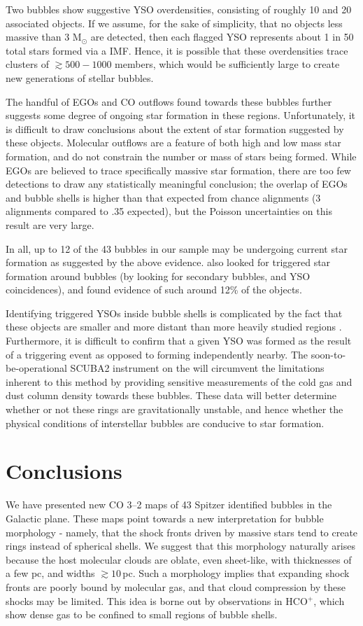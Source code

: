 Two bubbles show suggestive YSO overdensities, consisting of roughly 10 and 20 associated objects.
If we assume, for the sake of simplicity, that no objects less massive than 3 M$_\odot$ are detected, then each
flagged YSO represents about 1 in 50 total stars formed via a  IMF.
Hence, it is possible that these overdensities trace clusters of $\gtrsim 500-1000$ members,
which would be sufficiently large to create new generations of stellar bubbles.

The handful of EGOs and CO outflows found towards these bubbles further suggests some degree
of ongoing star formation in these regions. Unfortunately, it is difficult to draw conclusions
about the extent of star formation suggested by these objects. Molecular outflows are a feature of both
high and low mass star formation, and do not constrain the number or mass of stars being formed.
While EGOs are believed to trace specifically massive star formation, there are too
few detections to draw any statistically meaningful conclusion; the overlap of EGOs and
bubble shells is higher than that expected from chance alignments (3 alignments compared to .35 expected),
but the Poisson uncertainties on this result are very large.

In all, up to 12 of the 43 bubbles in our sample may be undergoing current star formation
as suggested by the above evidence.  also looked for triggered star formation
around bubbles (by looking for secondary bubbles, and YSO coincidences),
and found evidence of such around 12\% of the objects.

Identifying triggered YSOs inside bubble shells is complicated by the fact
that these objects are smaller and more distant than more heavily studied regions
\citep{Koenig08, Povich09}. Furthermore, it is difficult to confirm that a given
YSO was formed as the result of a triggering event as opposed to forming independently nearby.
The soon-to-be-operational SCUBA2
instrument on the \jcmt will circumvent the limitations inherent to this method by providing sensitive
measurements of the cold gas and dust column density towards these bubbles. These data will better determine
whether or not these rings are gravitationally unstable, and hence whether the physical
conditions of interstellar bubbles are conducive to star formation.

\section{Conclusions}
\label{sec:conclusion}
We have presented new CO 3--2 maps of 43 Spitzer identified
bubbles in the Galactic plane.  These maps point towards a new
interpretation for bubble morphology - namely, that the shock fronts
driven by massive stars tend to create rings instead of
spherical shells. We suggest that this morphology naturally arises
because the host molecular clouds are oblate, even sheet-like, with thicknesses of a few pc, and
widths $\gtrsim10$\,pc.
Such a morphology implies that expanding shock fronts are poorly bound by
molecular gas, and that cloud compression by these shocks may be limited. This
idea is borne out by observations in HCO$^+$, which show dense gas to be confined to
small regions of bubble shells.

